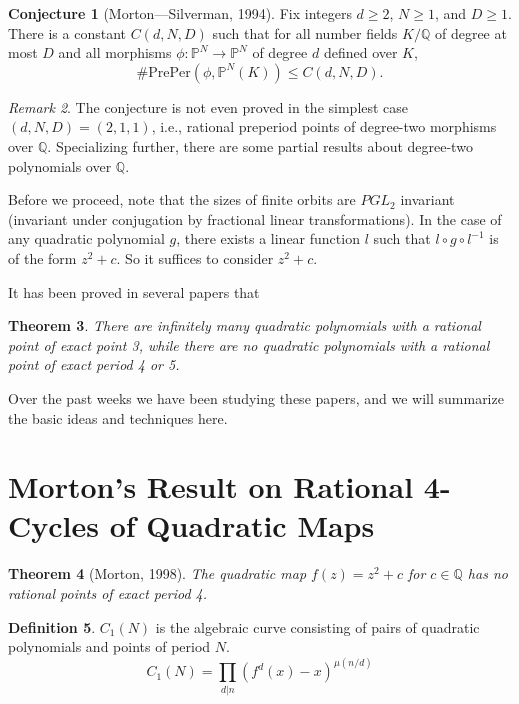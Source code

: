 \documentclass{amsart}
\theoremstyle{plain}
\newtheorem{theorem}{Theorem}[section]
\theoremstyle{definition}
\newtheorem{definition}[theorem]{Definition}
\newtheorem{conjecture}[theorem]{Conjecture}
\theoremstyle{remark}
\newtheorem{remark}[theorem]{Remark}
\renewcommand{\P}{\mathbb{P}}
\newcommand{\Q}{\mathbb{Q}}
\newcommand{\preper}{\mathrm{PrePer}}
\begin{document}
\begin{conjecture}[Morton---Silverman, 1994]
  Fix integers $d \ge 2$, $N \ge 1$, and $D \ge 1$. There is a
  constant $C(d, N, D)$ such that for all number fields $K/\Q$ of
  degree at most $D$ and all morphisms $\phi: \P^N \to \P^N$ of degree
  $d$ defined over $K$,
  \[
  \#\preper(\phi, \P^N(K)) \le C(d, N, D).
  \]
\end{conjecture}

\begin{remark}
  The conjecture is not even proved in the simplest case $(d, N, D) =
  (2, 1, 1)$, i.e., rational preperiod points of degree-two morphisms
  over $\Q$. Specializing further, there are some partial results
  about degree-two polynomials over $\Q$.

  Before we proceed, note that the sizes of finite orbits are $PGL_2$
  invariant (invariant under conjugation by fractional linear
  transformations). In the case of any quadratic polynomial $g$, there
  exists a linear function $l$ such that $l \circ g \circ l^{-1}$ is
  of the form $z^2 + c$. So it suffices to consider $z^2 + c$.

  It has been proved in several papers that
\end{remark}

\begin{theorem}
  There are infinitely many quadratic polynomials with a rational
  point of exact point 3, while there are no quadratic polynomials
  with a rational point of exact period 4 or 5.
\end{theorem}

Over the past weeks we have been studying these papers, and we will
summarize the basic ideas and techniques here.

\section{Morton's Result on Rational 4-Cycles of Quadratic Maps}

\begin{theorem} [Morton, 1998]
  The quadratic map $f(z) = z^2 + c$ for $c \in \Q$ has no rational
  points of exact period 4.
\end{theorem}

\begin{definition}
  $C_1(N)$ is the algebraic curve consisting of pairs of quadratic
  polynomials and points of period $N$.
  \[
  C_1(N) = \prod_{d|n}(f^d(x) - x)^{\mu(n/d)}
  \]
\end{definition}
\end{document}
